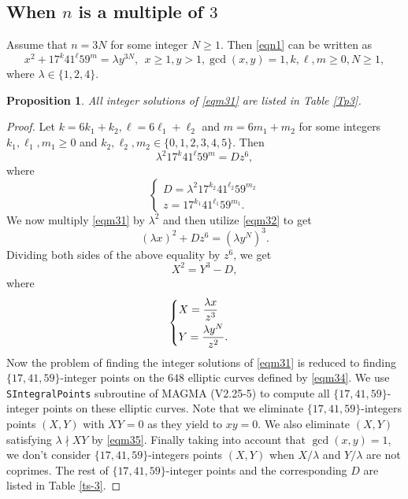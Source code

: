 \documentclass[12pt, 14paper,reqno]{amsart}
\theoremstyle{plain}
\newtheorem{prop}{Proposition}[section]
\theoremstyle{proof}
\numberwithin{equation}{section}
\begin{document}
\subsection{When $n$ is a multiple of $3$}\label{proofpropm3}
Assume that $n=3N$ for some integer $N\geq 1$. Then \eqref{eqn1} can be written as
\begin{equation}\label{eqm31}
x^2+17^k41^\ell 59^m =\lambda y^{3N},~~x\geq 1, y>1, \gcd(x,y)=1, k, \ell, m\geq 0, N\geq 1,
\end{equation}
where $\lambda\in \{1,2, 4\}$.

\begin{prop}\label{propm3}
All integer solutions of \eqref{eqm31} are listed in Table \ref{Tp3}.  
\end{prop}

\begin{proof}
Let $k=6k_1+k_2, \ell=6\ell_1+\ell_2$ and $m=6m_1+m_2$ for some integers $k_1, \ell_1, m_1\geq 0$ and $k_2, \ell_2, m_2\in\{0,1,2,3,4,5\}$. Then 
\begin{equation}\label{eqm32}
\lambda^2 17^k 41^\ell 59^m=Dz^6,
\end{equation}
where 
\begin{equation}\label{eqm33}
\begin{cases}
D=\lambda^2 17^{k_2}41^{\ell_2}59^{m_2}\\
 z=17^{k_1}41^{\ell_1}59^{m_1}.
 \end{cases}
\end{equation}
We now multiply \eqref{eqm31} by $\lambda^2$ and then utilize \eqref{eqm32} to get
$$
(\lambda x)^2+Dz^6=(\lambda y^N)^3.
$$
Dividing both sides of the above equality by $z^6$, we get 
\begin{equation}\label{eqm34}
X^2=Y^3-D,
\end{equation}
where 
\begin{equation}\label{eqm35}
\begin{cases}
X=\dfrac{\lambda x}{z^3}\vspace{1mm}\\
 Y=\dfrac{\lambda y^N}{z^2}.
 \end{cases}
\end{equation}
Now the problem of finding the integer solutions of \eqref{eqm31} is reduced to finding $\{17,41,59\}$-integer points on the $648$ elliptic curves defined by \eqref{eqm34}. We use \texttt{SIntegralPoints} subroutine of MAGMA (V2.25-5)\cite{BCP97} to compute all $\{17,41,59\}$-integer points on these elliptic curves. Note that we eliminate $\{17,41,59\}$-integers points $(X,Y)$ with $XY=0$ as they yield to $xy = 0$. We also eliminate $(X,Y)$ satisfying $\lambda\nmid XY$ by \eqref{eqm35}. Finally taking into account that $\gcd(x,y)=1$,  we don't consider $\{17,41,59\}$-integers points $(X,Y)$ when $X/\lambda$ and $Y/\lambda$ are not coprimes. The rest of $\{17,41,59\}$-integer points and the corresponding $D$ are listed in Table \ref{ts-3}. 


\end{proof}
\end{document}
